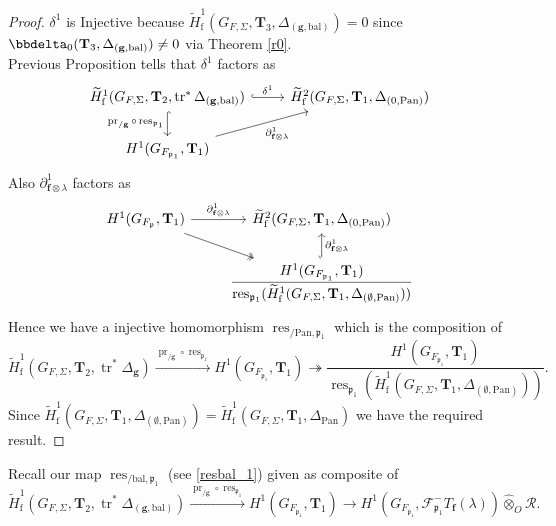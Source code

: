 \documentclass[10pt]{amsart}
\numberwithin{equation}{section}
\theoremstyle{definition}
\theoremstyle{remark} %
\newcommand{\pan}{\mathrm{Pan}}
\DeclareMathOperator{\res}{res}
\renewcommand{\b}{\mathrm{bal}}
\newcommand{\f}{\mathbf{f}}
\newcommand{\scrF}{\mathscr{F}}
\newcommand{\g}{\mathbf{g}}
\newcommand{\p}{\mathfrak{p}}
\newcommand{\R}{\mathcal{R}}
\newcommand{\T}{\mathbf{T}}
\newcommand{\hotimes}{\widehat{\otimes}}
\begin{document}
		\begin{proof}
			$ \delta^1 $ is Injective because $ \widetilde{H}^1_{\mathrm{f}}(G_{F,\Sigma}, \T_3, \Delta_{(\g,\b)}) =0 $ since $\bbdelta_0(\T_{3},\Delta_{(\g,\b)}) \ne 0 $ via Theorem \ref{r0}. \\
			Previous Proposition tells that $ \delta^1 $ factors as 
			\begin{equation}
				\begin{tikzcd}
					\widetilde{H}^1_{\mathrm{f}}(G_{F,\Sigma}, \T_2, \operatorname{tr}^*\Delta_{(\g,\b)}) \arrow[r, hook, "\delta^1"]
					\arrow[d, hook, "\operatorname{pr}_{/\g} \circ \res_{\p_1} " '] & \widetilde{H}^2_{\mathrm{f}}(G_{F,\Sigma}, \T_1, \Delta_{(0,\pan)}) \\
					H^1(G_{F_{\p_1}}, \T_{1}) \arrow[ur, "\partial_{\f \otimes \lambda}^1 " '] & 
				\end{tikzcd}
			\end{equation}
			Also $ \partial_{\f \otimes \lambda}^1$ factors as 
			\begin{equation}
				\begin{tikzcd}
					H^1(G_{F_{\p}}, \T_{1}) \arrow[r, "\partial_{\f \otimes \lambda}^1 "] \arrow[dr, twoheadrightarrow] & \widetilde{H}^2_{\mathrm{f}}(G_{F,\Sigma}, \T_1, \Delta_{(0,\pan)}) \\
					&  \dfrac{H^1(G_{F_{\p_1}}, \T_{1})}{\res_{\p_1}(\widetilde{H}^1_{\mathrm{f}}(G_{F,\Sigma},\T_{1}, \Delta_{(\emptyset,\pan)}))} \arrow[u, hook, " \partial_{\f \otimes \lambda}^1 " ']
				\end{tikzcd}
			\end{equation}
			Hence we have a injective homomorphism $ \res_{/\pan, \p_1} $ which is the composition of 
			$$ \widetilde{H}^1_{\mathrm{f}}(G_{F,\Sigma}, \T_2, \operatorname{tr}^*\Delta_{\g}) \xrightarrow{\operatorname{pr}_{/\g} \circ \res_{\p_1}} H^1(G_{F_{\p_1}}, \T_{1})\twoheadrightarrow \frac{H^1(G_{F_{\p_1}}, \T_{1})}{\res_{\p_1}(\widetilde{H}^1_{\mathrm{f}}(G_{F,\Sigma},\T_{1}, \Delta_{(\emptyset,\pan)}))} .$$
			Since $ \widetilde{H}^1_{\mathrm{f}}(G_{F,\Sigma},\T_{1}, \Delta_{(\emptyset,\pan)}) = \widetilde{H}^1_{\mathrm{f}}(G_{F,\Sigma},\T_{1}, \Delta_{\pan}) $ we have the  required result.
		\end{proof}
		Recall our map $ \res_{/\b, \p_1} $ (see \ref{resbal_1}) given as composite of 
		$$ \widetilde{H}^1_{\mathrm{f}}(G_{F,\Sigma}, \T_2, \operatorname{tr}^*\Delta_{(\g,\b)}) \xrightarrow{\operatorname{pr}_{/\g} \circ \res_{\p_1}} H^1(G_{F_{\p_1}}, \T_{1}) \rightarrow  H^1(G_{F_{\p_1}},\scrF^-_{\p_1} T_\f( \lambda)) \hotimes_O \R .$$
\end{document}
